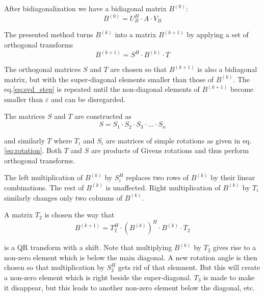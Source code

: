 \addvspace{12pt}

After bidiagonalization we have a bidiagonal matrix $B^{(0)}$:
\begin{equation}
B^{(0)} = U_B^H \cdot A \cdot V_B
\end{equation}

The presented method turns $B^{(k)}$ into a matrix $B^{(k+1)}$ by
applying a set of orthogonal transforms
\begin{equation}
\label{eq:svd_step}
B^{(k+1)} = S^H\cdot B^{(k)} \cdot T
\end{equation}

The orthogonal matrices $S$ and $T$ are chosen so that $B^{(k+1)}$ is
also a bidiagonal matrix, but with the super-diagonal elements smaller
than those of $B^{(k)}$.  The eq.\eqref{eq:svd_step} is repeated until
the non-diagonal elements of $B^{(k+1)}$ become smaller than
$\varepsilon$ and can be disregarded.

\addvspace{12pt}

The matrices $S$ and $T$ are constructed as
\begin{equation}
S = S_1 \cdot S_2 \cdot S_3\cdot \dots \cdot S_n
\end{equation}

and similarly $T$ where $T_i$ and $S_i$ are matrices of simple
rotations as given in eq.\eqref{eq:rotation}.  Both $T$ and $S$ are
products of Givens rotations and thus perform orthogonal transforms.

\addvspace{12pt}

The left multiplication of $B^{(k)}$ by $S_i^H$ replaces two rows of
$B^{(k)}$ by their linear combinations.  The rest of $B^{(k)}$ is
unaffected.  Right multiplication of $B^{(k)}$ by $T_i$ similarly
changes only two columns of $B^{(k)}$.

\addvspace{12pt}

A matrix $T_2$ is chosen the way that
\begin{equation}
B^{(k+1)} = T_2^H \cdot \left(B^{(k)}\right)^H \cdot B^{(k)} \cdot T_2
\end{equation}
 
is a QR transform with a shift.  Note that multiplying $B^{(k)}$ by
$T_2$ gives rise to a non-zero element which is below the main
diagonal.  A new rotation angle is then chosen so that multiplication
by $S_2^H$ gets rid of that elemnent.  But this will create a non-zero
element which is right beside the super-diagonal.  $T_3$ is made to
make it disappear, but this leads to another non-zero element below
the diagonal, etc.

